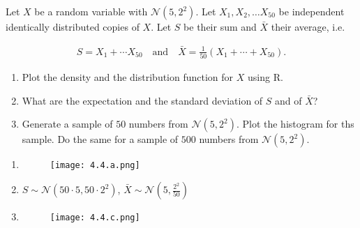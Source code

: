 
\begin{exercise}

Let $X$ be a random variable with $\mathcal N(5, 2^2)$.
Let $X_1, X_2, \dots X_{50}$ be independent identically distributed copies of $X$.
Let $S$ be their sum and $\bar X$ their average, i.e.

\begin{align*}
    S = X_1 + \cdots X_{50}
    \quad
    \text{and}
    \quad
    \bar X = \frac{1}{50} (X_1 + \cdots + X_{50}).
\end{align*}

\begin{enumerate}[label = (\alph*)]

    \item Plot the density and the distribution function for $X$ using R.

    \item What are the expectation and the standard deviation of $S$ and of $\bar X$?

    \item Generate a sample of $50$ numbers from $\mathcal N(5, 2^2)$.
    Plot the histogram for ths sample.
    Do the same for a sample of $500$ numbers from $\mathcal N(5, 2^2)$.

\end{enumerate}

\end{exercise}


\begin{solution}

\phantom{}

\begin{enumerate}[label = (\alph*)]

    \item \phantom{}
    
    

    \begin{figure}[H]
        \centering
        \texttt{[image: 4.4.a.png]}
        \caption{}
        \label{}
    \end{figure}

    \item $S \sim \mathcal N(50 \cdot 5, 50 \cdot 2^2)$, $\bar X \sim \mathcal N(5, \frac{2^2}{50})$

    \item \phantom{}

    

    \begin{figure}[H]
        \centering
        \texttt{[image: 4.4.c.png]}
        \caption{}
        \label{}
    \end{figure}

\end{enumerate}

\end{solution}

